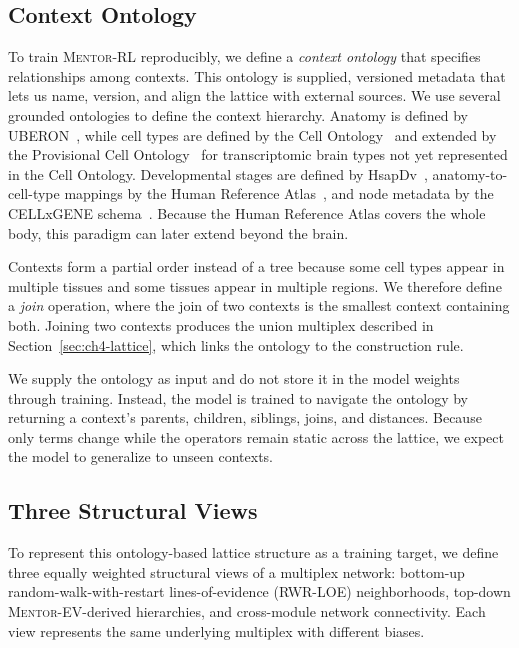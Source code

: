 \documentclass[thesis,letterpaper,12pt]{utthesis}
\begin{document}
\subsection{Context Ontology}\label{sec:ch4-ontology}
To train \textsc{Mentor-RL} reproducibly, we define a \textit{context ontology} that specifies relationships among contexts. This ontology is supplied, versioned metadata that lets us name, version, and align the lattice with external sources. We use several grounded ontologies to define the context hierarchy. Anatomy is defined by UBERON~\cite{uberon}, while cell types are defined by the Cell Ontology~\cite{cellontology} and extended by the Provisional Cell Ontology~\cite{pcl} for transcriptomic brain types not yet represented in the Cell Ontology. Developmental stages are defined by HsapDv~\cite{hsapdv}, anatomy-to-cell-type mappings by the Human Reference Atlas~\cite{asctb}, and node metadata by the CELLxGENE schema~\cite{cellxgene}. Because the Human Reference Atlas covers the whole body, this paradigm can later extend beyond the brain.

Contexts form a partial order instead of a tree because some cell types appear in multiple tissues and some tissues appear in multiple regions. We therefore define a \textit{join} operation, where the join of two contexts is the smallest context containing both. Joining two contexts produces the union multiplex described in Section~\ref{sec:ch4-lattice}, which links the ontology to the construction rule.

We supply the ontology as input and do not store it in the model weights through training. Instead, the model is trained to navigate the ontology by returning a context's parents, children, siblings, joins, and distances. Because only terms change while the operators remain static across the lattice, we expect the model to generalize to unseen contexts.

\subsection{Three Structural Views}\label{sec:ch4-views}
To represent this ontology-based lattice structure as a training target, we define three equally weighted structural views of a multiplex network: bottom-up random-walk-with-restart lines-of-evidence (RWR-LOE) neighborhoods, top-down \textsc{Mentor-EV}-derived hierarchies, and cross-module network connectivity. Each view represents the same underlying multiplex with different biases.
\end{document}
